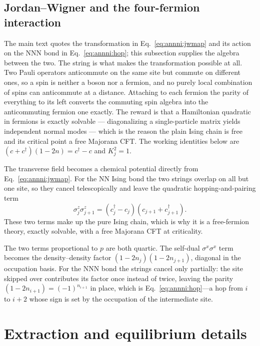 \subsection{Jordan--Wigner and the four-fermion interaction}
\label{app:pairing:jw}

The main text quotes the transformation in Eq.~\eqref{eq:annni:jwmap} and its action on the \ac{NNN} bond in Eq.~\eqref{eq:annni:hop}; this subsection supplies the algebra between the two. The string is what makes the transformation possible at all. Two Pauli operators anticommute on the same site but commute on different ones, so a spin is neither a boson nor a fermion, and no purely local combination of spins can anticommute at a distance. Attaching to each fermion the parity of everything to its left converts the commuting spin algebra into the anticommuting fermion one exactly. The reward is that a Hamiltonian quadratic in fermions is exactly solvable --- diagonalizing a single-particle matrix yields independent normal modes --- which is the reason the plain Ising chain is free and its critical point a free Majorana \ac{CFT}. The working identities below are $(c+c^\dagger)(1-2n)=c^\dagger-c$ and $K_j^2=1$.

The transverse field becomes a chemical potential directly from Eq.~\eqref{eq:annni:jwmap}. For the \ac{NN} Ising bond the two strings overlap on all but one site, so they cancel telescopically and leave the quadratic hopping-and-pairing term
\begin{equation}
    \sigma^z_j\sigma^z_{j+1} = (c_j^\dagger-c_j)(c_{j+1}+c_{j+1}^\dagger).
    \tag{F1}
\end{equation}
These two terms make up the pure Ising chain, which is why it is a free-fermion theory, exactly solvable, with a free Majorana \ac{CFT} at criticality.

The two terms proportional to $p$ are both quartic. The self-dual $\sigma^x\sigma^x$ term becomes the density--density factor $(1-2n_j)(1-2n_{j+1})$, diagonal in the occupation basis. For the \ac{NNN} bond the strings cancel only partially: the site skipped over contributes its factor once instead of twice, leaving the parity $(1-2n_{i+1})=(-1)^{n_{i+1}}$ in place, which is Eq.~\eqref{eq:annni:hop}---a hop from $i$ to $i+2$ whose sign is set by the occupation of the intermediate site.


\FloatBarrier
\section{Extraction and equilibrium details}
\label{app:extraction}


